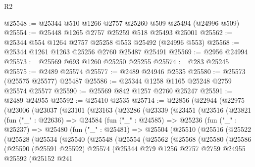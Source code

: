\begin{lexlean}{R2}
\begin{coremodule}
@25548 := @25344 @510 @1266 @2757 @25260 @509 @25494 (@24996 @509)
@25554 := @25448 @1265 @2757 @25259 @518 @25493 @25001
@25562 := @25344 @554 @1264 @2757 @25258 @553 @25492 (@24996 @553)
@25568 := @25344 @1261 @1263 @25256 @2760 @25487 @25491
@25569 := @2956 @24994
@25573 := @25569 @693 @1260 @25250 @25255
@25574 := @283 @25245
@25575 := @2489 @25574
@25577 := @2489 @24946 @2535
@25580 := @25573 (@25575 @25577) @25487
@25586 := @25344 @1258 @1165 @25248 @2759 @25574 @25577
@25590 := @25569 @842 @1257 @2760 @25247
@25591 := @2489 @24955
@25592 := @25410 @2535
@25714 := @22856
    (@22944
      (@22975
        (@23006
          (@23037
            (@23101
              (@23163
                (@23286
                  (@23339
                    (@23451
                      (@23516
                        (@23821
                          (fun ("_" : @22636) =>
                          @24584
                            (fun ("_" : @24585) =>
                            @25236
                              (fun ("_" : @25237) =>
                              @25480
                                (fun ("_" : @25481) =>
                                @25504
                                  (@25510
                                    (@25516
                                      (@25522
                                        (@25528
                                          (@25534
                                            (@25540
                                              (@25548
                                                (@25554
                                                  (@25562
                                                    (@25568
                                                      (@25580
                                                        (@25586
                                                          (@25590
                                                            (@25591 @25592)
                                                            @25574
                                                            (@25344
                                                              @279
                                                              @1256
                                                              @2757
                                                              @2759
                                                              @24955
                                                              @25592
                                                              (@25152
                                                                @241

\end{coremodule}
\end{lexlean}

